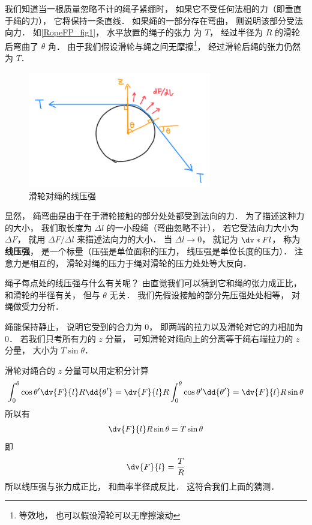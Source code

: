 
我们知道当一根质量忽略不计的绳子紧绷时， 如果它不受任何法相的力（即垂直于绳的力）， 它将保持一条直线． 如果绳的一部分存在弯曲， 则说明该部分受法向力． 如\autoref{RopeFP_fig1}， 水平放置的绳子的张力%
为 $T$， 经过半径为 $R$ 的滑轮后弯曲了 $\theta$ 角． 由于我们假设滑轮与绳之间无摩擦\footnote{等效地， 也可以假设滑轮可以无摩擦滚动}， 经过滑轮后绳的张力仍然为 $T$．

\begin{figure}[ht]
\centering
\includegraphics[width=8cm]{./figures/RopeFP1.png}
\caption{滑轮对绳的线压强} \label{RopeFP_fig1}
\end{figure}

显然， 绳弯曲是由于在于滑轮接触的部分处处都受到法向的力． 为了描述这种力的大小， 我们取长度为 $\Delta l$ 的一小段绳（弯曲忽略不计）， 若它受法向力大小为 $\Delta F$， 就用 $\Delta F/\Delta l$ 来描述法向力的大小． 当 $\Delta l \to 0$， 就记为 $\dv*{F}{l}$， 称为\textbf{线压强}， 是一个标量（压强是单位面积的压力， 线压强是单位长度的压力）． 注意力是相互的， 滑轮对绳的压力于绳对滑轮的压力处处等大反向．

绳子每点处的线压强与什么有关呢？ 由直觉我们可以猜到它和绳的张力成正比， 和滑轮的半径有关， 但与 $\theta$ 无关． 我们先假设接触的部分先压强处处相等， 对绳做受力分析．

绳能保持静止， 说明它受到的合力为 0， 即两端的拉力以及滑轮对它的力相加为 0． 若我们只考所有力的 $z$ 分量， 可知滑轮对绳向上的分离等于绳右端拉力的 $z$ 分量， 大小为 $T \sin\theta$．

滑轮对绳合的 $z$ 分量可以用定积分计算
\begin{equation}
\int_0^\theta \cos\theta' \dv{F}{l} R\dd{\theta'}
= \dv{F}{l} R \int_0^\theta \cos\theta' \dd{\theta'}
= \dv{F}{l} R \sin\theta
\end{equation}
所以有
\begin{equation}
\dv{F}{l} R \sin\theta = T \sin\theta
\end{equation}
即
\begin{equation}\label{RopeFP_eq1}
\dv{F}{l} = \frac{T}{R}
\end{equation}
所以线压强与张力成正比， 和曲率半径成反比． 这符合我们上面的猜测．

